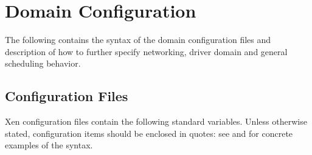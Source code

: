 \chapter{Domain Configuration}
\label{cha:config}

The following contains the syntax of the domain configuration files
and description of how to further specify networking, driver domain
and general scheduling behavior.


\section{Configuration Files}
\label{s:cfiles}

Xen configuration files contain the following standard variables.
Unless otherwise stated, configuration items should be enclosed in
quotes: see  and 
for concrete examples of the syntax.

